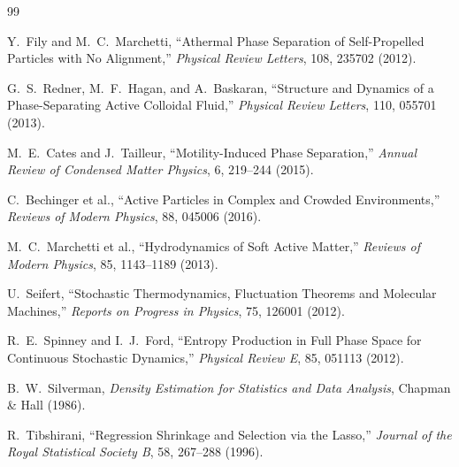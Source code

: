 \documentclass[11pt]{article}
\begin{document}
\begin{thebibliography}{99}


Y.~Fily and M.~C.~Marchetti,
``Athermal Phase Separation of Self-Propelled Particles with No Alignment,''
\emph{Physical Review Letters}, 108, 235702 (2012).

G.~S.~Redner, M.~F.~Hagan, and A.~Baskaran,
``Structure and Dynamics of a Phase-Separating Active Colloidal Fluid,''
\emph{Physical Review Letters}, 110, 055701 (2013).

M.~E.~Cates and J.~Tailleur,
``Motility-Induced Phase Separation,''
\emph{Annual Review of Condensed Matter Physics},
6, 219--244 (2015).

C.~Bechinger et al.,
``Active Particles in Complex and Crowded Environments,''
\emph{Reviews of Modern Physics},
88, 045006 (2016).

M.~C.~Marchetti et al.,
``Hydrodynamics of Soft Active Matter,''
\emph{Reviews of Modern Physics},
85, 1143--1189 (2013).


U.~Seifert,
``Stochastic Thermodynamics, Fluctuation Theorems and Molecular Machines,''
\emph{Reports on Progress in Physics},
75, 126001 (2012).

R.~E.~Spinney and I.~J.~Ford,
``Entropy Production in Full Phase Space for Continuous Stochastic Dynamics,''
\emph{Physical Review E},
85, 051113 (2012).


B.~W.~Silverman,
\emph{Density Estimation for Statistics and Data Analysis},
Chapman \& Hall (1986).


R.~Tibshirani,
``Regression Shrinkage and Selection via the Lasso,''
\emph{Journal of the Royal Statistical Society B},
58, 267--288 (1996).


\end{thebibliography}
\end{document}
